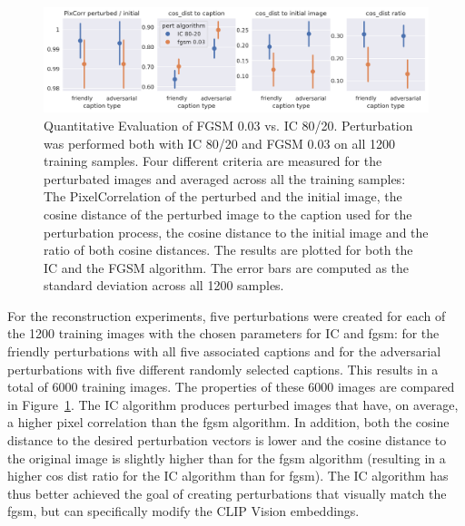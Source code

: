 \begin{figure}[ht]
    \centering
    \includegraphics[width=1\textwidth]{plots/advpert_validation_chosen_perts.png}
    \caption[Quantitative Evaluation of FGSM 0.03 vs. IC 80/20]{Quantitative Evaluation of FGSM 0.03 vs. IC 80/20. Perturbation was performed both with IC 80/20 and FGSM 0.03 on all 1200 training samples. Four different criteria are measured for the perturbated images and averaged across all the training samples: The PixelCorrelation of the perturbed and the initial image, the cosine distance of the perturbed image to the caption used for the perturbation process, the cosine distance to the initial image and the ratio of both cosine distances. The results are plotted for both the IC and the FGSM algorithm. The error bars are computed as the standard deviation across all 1200 samples.}\label{fig:advpert_validation_chosen_perts} 
\end{figure}
    
For the reconstruction experiments, five perturbations were created for each of the 1200 training images with the chosen parameters for IC and fgsm: for the friendly perturbations with all five associated captions and for the adversarial perturbations with five different randomly selected captions. This results in a total of 6000 training images. The properties of these 6000 images are compared in Figure~\ref{fig:advpert_validation_chosen_perts}. The IC algorithm produces perturbed images that have, on average, a higher pixel correlation than the fgsm algorithm. In addition, both the cosine distance to the desired perturbation vectors is lower and the cosine distance to the original image is slightly higher than for the fgsm algorithm (resulting in a higher cos dist ratio for the IC algorithm than for fgsm). The IC algorithm has thus better achieved the goal of creating perturbations that visually match the fgsm, but can specifically modify the CLIP Vision embeddings.

